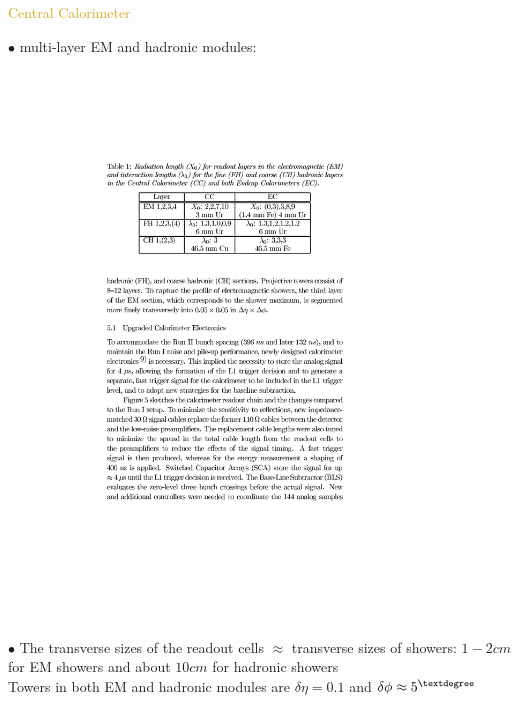 \begin{frame}{\textcolor{Goldenrod}{Central Calorimeter}}
\begin{overlayarea}{\textwidth}{\textheight}
  \item[$\bullet$] multi-layer EM and hadronic modules:\\
    \begin{figure}[h]\centering
      \includegraphics[height=0.2\textheight]{./Images/39_CAL_layers.pdf}
    \end{figure}
  \item[$\bullet$]
    The transverse sizes of the readout cells $\approx$ transverse sizes
    of showers: $1-2 cm$ for EM showers and about $10 cm$ for hadronic showers\\
    Towers in both EM and hadronic modules are $\delta \eta = 0.1$ and
    $\delta \phi \approx 5^{\textdegree}$
    
    
    

\end{overlayarea}
\end{frame}
